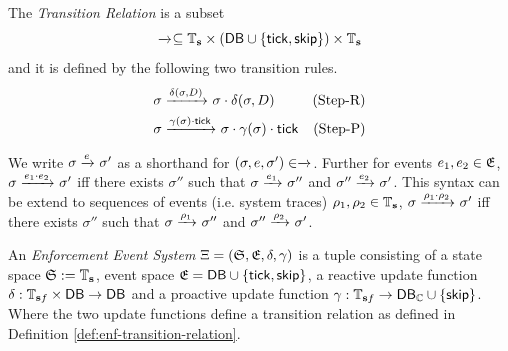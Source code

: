 \begin{definition}
    \label{def:enf-transition-relation}
    The \emph{Transition Relation} is a subset
    \begin{equation*}
        \xrightarrow{}_{} \subseteq
        \mathbb{T}_{\mathbf{s}}
        \times (\mathsf{DB} \cup \{\mathsf{tick}, \mathsf{skip} \} )
        \times \mathbb{T}_{\mathbf{s}}
    \end{equation*}
    and it is defined by the following two transition rules.
    \begin{align*}
        \sigma &\xrightarrow{\delta(\sigma, D)}_{} \sigma \cdot \delta(\sigma, D)
            & \text{(Step-R)} \\
        \sigma &\xrightarrow{\gamma(\sigma) \cdot \mathsf{tick}}_{}
            \sigma \cdot \gamma(\sigma) \cdot \mathsf{tick}
            & \text{(Step-P)}
    \end{align*}
\end{definition}
We write $\sigma \xrightarrow{e}_{} \sigma'$
as a shorthand for
$(\sigma, e, \sigma') \in \xrightarrow{}_{}$.
Further for events $e_1, e_2 \in \mathfrak{E}$,
$\sigma \xrightarrow{e_1 \cdot e_2}_{} \sigma'$ iff
there exists $\sigma''$ such that
$\sigma \xrightarrow{e_1}_{} \sigma''$ and
$\sigma'' \xrightarrow{e_2}_{} \sigma'$.
This syntax can be extend to sequences of events (i.e. system traces)
$\rho_1, \rho_2 \in \mathbb{T}_{\mathbf{s}}$,
$\sigma \xrightarrow{\rho_1 \cdot \rho_2}_{} \sigma'$ iff
there exists $\sigma''$ such that
$\sigma \xrightarrow{\rho_1}_{} \sigma''$ and
$\sigma'' \xrightarrow{\rho_2}_{} \sigma'$.

\begin{definition}
    \label{def:enforcement-event-system}
    An \emph{Enforcement Event System} 
    $\Xi = \left(\mathfrak{S}, \mathfrak{E}, \delta, \gamma \right)$
    is a tuple consisting of a state space $\mathfrak{S} := \mathbb{T}_{\mathbf{s}}$,
    event space $\mathfrak{E} = \mathsf{DB} \cup \left\{ \mathsf{tick}, \mathsf{skip} \right\}$,
    a reactive update function
    $\delta : \mathbb{T}_{\mathbf{s} f} \times \mathsf{DB} \to \mathsf{DB}$
    and a proactive update function
    $\gamma : \mathbb{T}_{\mathbf{s} f} \to \mathsf{DB}_{\mathbb{C}} \cup \left\{ \mathsf{skip} \right\}$.
    Where the two update functions define a transition relation as 
    defined in Definition \ref{def:enf-transition-relation}.
\end{definition}

